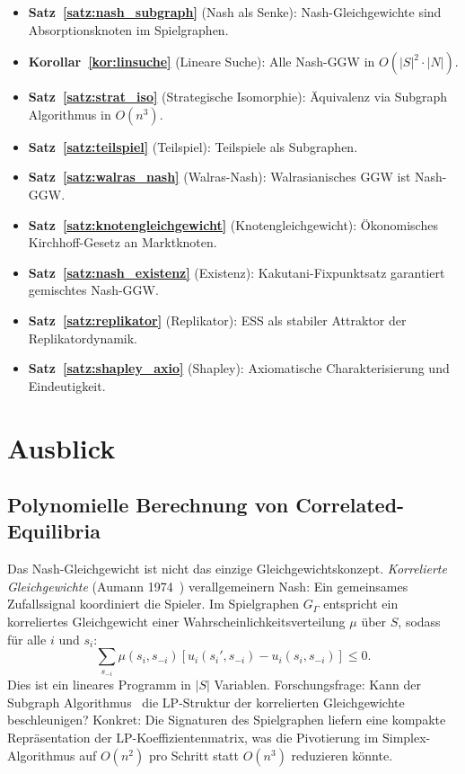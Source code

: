 ﻿\documentclass[a4paper,12pt]{article}
\theoremstyle{definition}
\begin{document}
\begin{itemize}
    \item \textbf{Satz~\ref{satz:nash_subgraph}} (Nash als Senke):
          Nash-Gleichgewichte sind Absorptionsknoten im Spielgraphen.
    \item \textbf{Korollar~\ref{kor:linsuche}} (Lineare Suche):
          Alle Nash-GGW in $O(|S|^2 \cdot |N|)$.
    \item \textbf{Satz~\ref{satz:strat_iso}} (Strategische Isomorphie):
          \"Aquivalenz via Subgraph Algorithmus in $O(n^3)$.
    \item \textbf{Satz~\ref{satz:teilspiel}} (Teilspiel):
          Teilspiele als Subgraphen.
    \item \textbf{Satz~\ref{satz:walras_nash}} (Walras-Nash):
          Walrasianisches GGW ist Nash-GGW.
    \item \textbf{Satz~\ref{satz:knotengleichgewicht}} (Knotengleichgewicht):
          \"Okonomisches Kirchhoff-Gesetz an Marktknoten.
    \item \textbf{Satz~\ref{satz:nash_existenz}} (Existenz):
          Kakutani-Fixpunktsatz garantiert gemischtes Nash-GGW.
    \item \textbf{Satz~\ref{satz:replikator}} (Replikator):
          ESS als stabiler Attraktor der Replikatordynamik.
    \item \textbf{Satz~\ref{satz:shapley_axio}} (Shapley):
          Axiomatische Charakterisierung und Eindeutigkeit.
\end{itemize}

\section{Ausblick}

\subsection{Polynomielle Berechnung von Correlated-Equilibria}

Das Nash-Gleichgewicht ist nicht das einzige Gleichgewichtskonzept.
\emph{Korrelierte Gleichgewichte} (Aumann 1974~\cite{aumann1974}) verallgemeinern
Nash: Ein gemeinsames Zufallssignal koordiniert die Spieler.
Im Spielgraphen $G_\Gamma$ entspricht ein korreliertes Gleichgewicht einer
Wahrscheinlichkeitsverteilung $\mu$ \"uber $S$, sodass f\"ur alle $i$ und $s_i$:
\[
\sum_{s_{-i}} \mu(s_i, s_{-i}) [u_i(s_i', s_{-i}) - u_i(s_i, s_{-i})] \leq 0.
\]
Dies ist ein lineares Programm in $|S|$ Variablen.
Forschungsfrage: Kann der Subgraph Algorithmus~\cite{epp2026subgraph} die
LP-Struktur der korrelierten Gleichgewichte beschleunigen?
Konkret: Die Signaturen des Spielgraphen liefern eine kompakte Repr\"asentation
der LP-Koeffizientenmatrix, was die Pivotierung im Simplex-Algorithmus
auf $O(n^2)$ pro Schritt statt $O(n^3)$ reduzieren k\"onnte.
\end{document}
